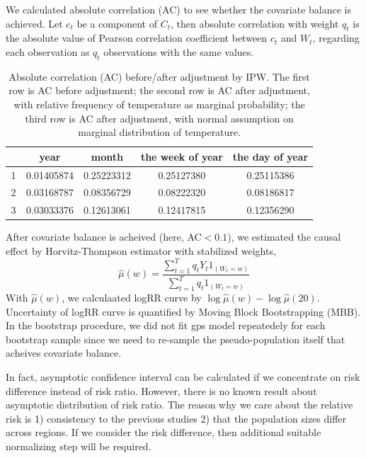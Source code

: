 \documentclass[12pt]{article}
\begin{document}
We calculated absolute correlation (AC)\cite{gpsboosting2015} 
to see whether the covariate balance is achieved.
Let $c_t$ be a component of $C_t$, then absolute correlation with weight $q_t$ is
the absolute value of Pearson correlation coefficient between $c_t$ and $W_t$,
regarding each observation as $q_t$ observations with the same values.

\begin{table}[ht]
	\centering
\begin{tabular}{|| c || c | c | c | c || }
	\hline\hline
	\ & year & month & the week of year & the day of year \\
	\hline
	1 & 0.01405874 & 0.25223312 & 0.25127380 & 0.25115386 \\ %
	\hline
	2 & 0.03168787 & 0.08356729 & 0.08222320 & 0.08186817 \\ %
	\hline
	3 & 0.03033376 & 0.12613061 & 0.12417815 & 0.12356290 \\ %
	\hline\hline
	
\end{tabular}
\caption[Table 1.]
{Absolute correlation (AC) before/after adjustment by IPW.
The first row is AC before adjustment;
the second row is AC after adjustment, with relative frequency of temperature as marginal probability;
the third row is AC after adjustment, with normal assumption on marginal distribution of temperature.}
\end{table}

After covariate balance is acheived (here, AC$<0.1$), 
we estimated the causal effect by Horvitz-Thompson estimator with stabilized weights,
\[
	\hat{\mu}(w) = \frac{\sum_{t = 1}^T q_t Y_t 1_{(W_t = w)}}{\sum_{t = 1}^T q_t 1_{(W_t = w)}}
\]
With $\hat{\mu}(w)$, we calculaated logRR curve by $\log\hat{\mu}(w) - \log \hat{\mu}(20)$.
Uncertainty of logRR curve is quantified by Moving Block Bootstrapping (MBB)\cite{mbb1989}.
In the bootstrap procedure, we did not fit gps model repeatedely for each bootstrap sample
since we need to re-sample the pseudo-population itself that acheives covariate balance.

In fact, asymptotic confidence interval can be calculated 
if we concentrate on risk difference instead of risk ratio.
However, there is no known result about asymptotic distribution of risk ratio.
The reason why we care about the relative risk is
1) consistency to the previous studies
2) that the population sizes differ across regions.
If we consider the risk difference, then additional suitable normalizing step will be required.
\end{document}

